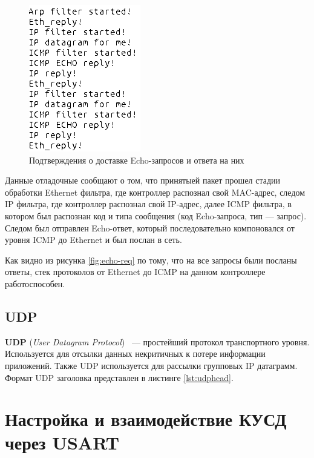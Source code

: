 \begin{figure}[h!]
	\centering
		\includegraphics[scale=0.7]{img/echo-reply-log.png}
	\caption{Подтверждения о доставке Echo-запросов и ответа на них\label{fig:echo-reply-log}}
\end{figure}

Данные отладочные сообщают о том, что принятыей пакет прошел стадии обработки Ethernet фильтра, где контроллер распознал свой MAC-адрес, следом IP фильтра, где контроллер распознал свой IP-адрес, далее ICMP фильтра, в котором был распознан код и типа сообщения (код Echo-запроса, тип --- запрос). Следом был отправлен Echo-ответ, который последовательно компоновался от уровня ICMP до Ethernet и был послан в сеть.

Как видно из рисунка \ref{fig:echo-req} по тому, что на все запросы были посланы ответы, стек протоколов от Ethernet до ICMP на данном контроллере работоспособен.

\subsection{UDP}

\textbf{UDP} (\textit{User Datagram Protocol}) ~--- простейший протокол транспортного уровня. Используется для отсылки данных некритичных к потере информации приложений. Также UDP используется для рассылки групповых IP датаграмм. Формат UDP заголовка представлен в листинге \ref{lst:udphead}.

{\small{}}

\section{Настройка и взаимодействие КУСД через USART}

